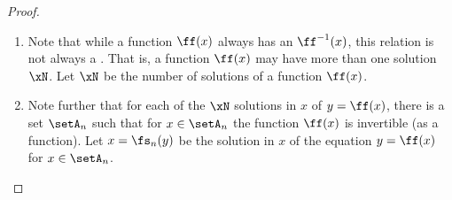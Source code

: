 \begin{proof}
\begin{enumerate}
  \item \label{item:YfX_N}
        Note that while a function $\ff(x)$ always has an  $\ff^{-1}(x)$,
        this relation is not always a .
        That is, a function $\ff(x)$ may have more than one solution $\xN$.
        Let $\xN$ be the number of solutions of a function $\ff(x)$.

  \item \label{item:YfX_s}
        Note further that for each of the $\xN$ solutions in $x$ of $y=\ff(x)$,
        there is a set $\setA_n$ such that for $x\in\setA_n$ the function $\ff(x)$ is
        invertible (as a function).
        Let $x=\fs_n(y)$ be the solution in $x$ of the equation $y=\ff(x)$ for $x\in\setA_n$.


\end{enumerate}
\end{proof}
